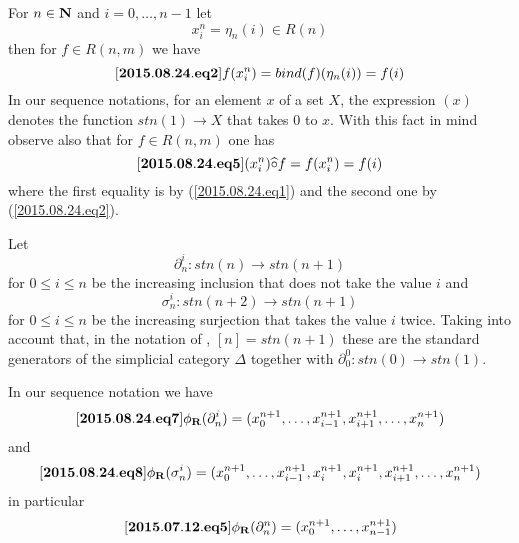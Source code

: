 \documentclass[11pt]{article}
\newenvironment{eq}{\begin{equation}}{\end{equation}}
\newcommand{\llabel}[1]{\label{#1}[{\bf #1}]}
\newcommand{\sr}{\rightarrow}
\newcommand{\nn}{{\bf N\rm}}
\newcommand{\nat}{\nn}
\newcommand{\rr}{{\bf R}}
\newcommand{\wh}{\widehat}
\newcommand{\bind}{bind}
\newcommand{\hc}{\wh{\circ}}
\begin{document}
For $n\in\nat$ and $i=0,\dots,n-1$ let
%
$$x_i^n=\eta_n(i)\in R(n)$$
%
then for $f\in R(n,m)$ we have
%
\begin{eq}\llabel{2015.08.24.eq2}
f(x_i^n)=\bind(f)(\eta_n(i))=f(i)
\end{eq}
%
In our sequence notations, for an element $x$ of a set $X$, the expression $(x)$ denotes the function $stn(1)\sr X$ that takes $0$ to $x$. With this fact in mind observe also that for $f\in R(n,m)$ one has
%
\begin{eq}\llabel{2015.08.24.eq5}
(x_i^n)\hc f=f(x_i^n)=f(i)
\end{eq}
%
where the first equality is by  (\ref{2015.08.24.eq1}) and the second one by (\ref{2015.08.24.eq2}). 


Let 
%
$$\partial^{i}_{n}:stn(n)\sr stn(n+1)$$
%
for $0\le i\le n$ be the increasing inclusion that does not take the value $i$ and
%
$$\sigma^{i}_{n}:stn(n+2)\sr stn(n+1)$$
%
for $0\le i\le n$ be the increasing surjection that takes the value $i$ twice. Taking into account that, in the notation of \cite{GabZis}, $[n]=stn(n+1)$ these are the standard generators of the simplicial category $\Delta$ together with $\partial^0_0:stn(0)\sr stn(1)$. 

In our sequence notation we have
%
\begin{eq}\llabel{2015.08.24.eq7}
\phi_{\rr}(\partial^{i}_{n})=(x_0^{n+1},\dots,x_{i-1}^{n+1},x_{i+1}^{n+1},\dots,x_n^{n+1})
\end{eq}
%
and
%
\begin{eq}\llabel{2015.08.24.eq8}
\phi_{\rr}(\sigma^{i}_{n})=(x_0^{n+1},\dots,x_{i-1}^{n+1},x_i^{n+1},x_i^{n+1},x_{i+1}^{n+1},\dots,x_n^{n+1})
\end{eq}
%
in particular
%
\begin{eq}\llabel{2015.07.12.eq5}
\phi_{\rr}(\partial^{n}_n)=(x_0^{n+1},\dots,x_{n-1}^{n+1})
\end{eq}
%
\end{document}
